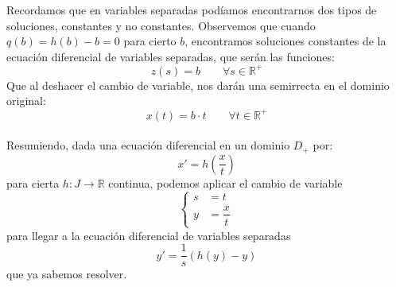 Recordamos que en variables separadas podíamos encontrarnos dos tipos de soluciones, constantes y no constantes. Observemos que cuando $q(b)=h(b)-b=0$ para cierto $b$, encontramos soluciones constantes de la ecuación diferencial de variables separadas, que serán las funciones:
\begin{equation*}
    z(s) = b \qquad \forall s\in \mathbb{R}^+
\end{equation*}
Que al deshacer el cambio de variable, nos darán una semirrecta en el dominio original:
\begin{equation*}
    x(t) = b\cdot t \qquad \forall t\in \mathbb{R}^+
\end{equation*}~\\
Resumiendo, dada una ecuación diferencial en un dominio $D_+$ por:
\begin{equation*}
    x' = h\left(\dfrac{x}{t}\right)
\end{equation*}
para cierta $h:J\rightarrow\mathbb{R}$ continua, podemos aplicar el cambio de variable
\begin{equation*}
    \left\{\begin{array}{rl}
            s &= t \\
            y &= \dfrac{x}{t}
    \end{array}\right.
\end{equation*}
para llegar a la ecuación diferencial de variables separadas
\begin{equation*}
    y' = \dfrac{1}{s}(h(y)-y)
\end{equation*}
que ya sabemos resolver.

